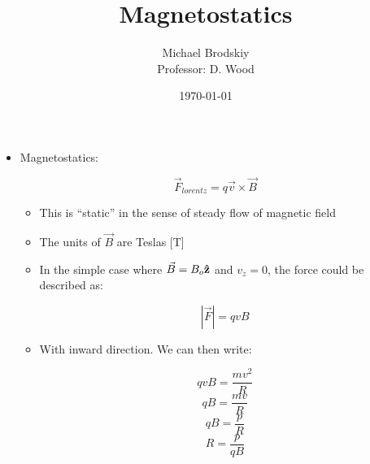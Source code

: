 


\title{Magnetostatics}
\date{\today}
\author{Michael Brodskiy\\ \small Professor: D. Wood}



\maketitle

\begin{itemize}

  \item Magnetostatics:

    $$\vec{F}_{lorentz}=q\vec{v}\times\vec{B}$$

    \begin{itemize}

      \item This is ``static'' in the sense of steady flow of magnetic field

      \item The units of $\vec{B}$ are Teslas [$\si{\tesla}$]

      \item In the simple case where $\vec{B}=B_o\bold{\hat{z}}$ and $v_z=0$, the force could be described as:

        $$|\vec{F}|=qvB$$

      \item With inward direction. We can then write:

        $$qvB=\frac{mv^2}{R}$$
        $$qB=\frac{mv}{R}$$
        $$qB=\frac{p}{R}$$
        $$R=\frac{p}{qB}$$

    \end{itemize}

\end{itemize}



